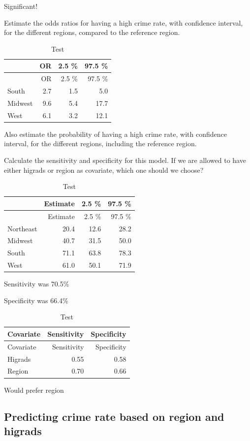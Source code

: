 \documentclass[a4paper]{article}
\begin{document}
Significant!

Estimate the odds ratios for having a high crime rate, with confidence
interval, for the different regions, compared to the reference region.

\begin{longtable}[]{@{}lrrr@{}}
\caption{Test}\tabularnewline
\toprule
& OR & 2.5 \% & 97.5 \%\tabularnewline
\midrule
\endfirsthead
\toprule
& OR & 2.5 \% & 97.5 \%\tabularnewline
\midrule
\endhead
South & 2.7 & 1.5 & 5.0\tabularnewline
Midwest & 9.6 & 5.4 & 17.7\tabularnewline
West & 6.1 & 3.2 & 12.1\tabularnewline
\bottomrule
\end{longtable}

Also estimate the probability of having a high crime rate, with
confidence interval, for the different regions, including the reference
region.

Calculate the sensitivity and specificity for this model. If we are
allowed to have either higrads or region as covariate, which one should
we choose?

\begin{longtable}[]{@{}lrrr@{}}
\caption{Test}\tabularnewline
\toprule
& Estimate & 2.5 \% & 97.5 \%\tabularnewline
\midrule
\endfirsthead
\toprule
& Estimate & 2.5 \% & 97.5 \%\tabularnewline
\midrule
\endhead
Northeast & 20.4 & 12.6 & 28.2\tabularnewline
Midwest & 40.7 & 31.5 & 50.0\tabularnewline
South & 71.1 & 63.8 & 78.3\tabularnewline
West & 61.0 & 50.1 & 71.9\tabularnewline
\bottomrule
\end{longtable}

Sensitivity was 70.5\%

Specificity was 66.4\%

\begin{longtable}[]{@{}lrr@{}}
\caption{Test}\tabularnewline
\toprule
Covariate & Sensitivity & Specificity\tabularnewline
\midrule
\endfirsthead
\toprule
Covariate & Sensitivity & Specificity\tabularnewline
\midrule
\endhead
Higrads & 0.55 & 0.58\tabularnewline
Region & 0.70 & 0.66\tabularnewline
\bottomrule
\end{longtable}

Would prefer region

\hypertarget{predicting-crime-rate-based-on-region-and-higrads}{%
\subsection{Predicting crime rate based on region and
higrads}\label{predicting-crime-rate-based-on-region-and-higrads}}
\end{document}
